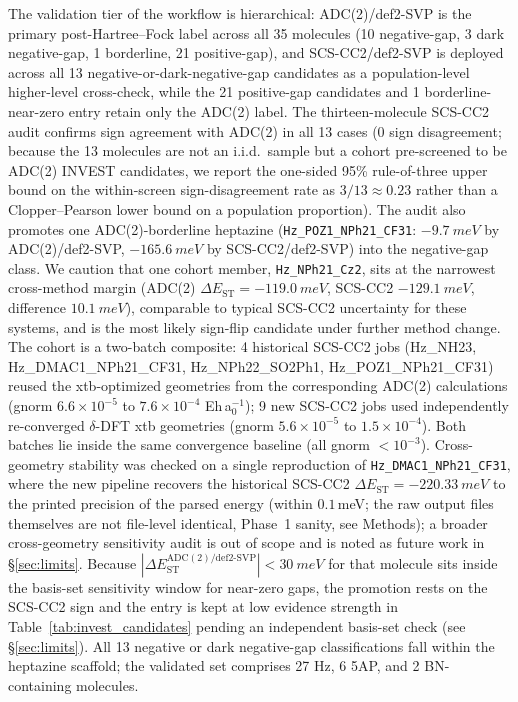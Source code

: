 \documentclass[journal=jcisd8,manuscript=article]{achemso}
\begin{document}
The validation tier of the workflow is hierarchical: ADC(2)/def2-SVP is the primary post-Hartree--Fock label across all 35 molecules (10 negative-gap, 3 dark negative-gap, 1 borderline, 21 positive-gap), and SCS-CC2/def2-SVP is deployed across all 13 negative-or-dark-negative-gap candidates as a population-level higher-level cross-check, while the 21 positive-gap candidates and 1 borderline-near-zero entry retain only the ADC(2) label. The thirteen-molecule SCS-CC2 audit confirms sign agreement with ADC(2) in all 13 cases (0 sign disagreement; because the 13 molecules are not an i.i.d.\ sample but a cohort pre-screened to be ADC(2) INVEST candidates, we report the one-sided 95\% rule-of-three upper bound on the within-screen sign-disagreement rate as $3/13 \approx 0.23$ rather than a Clopper--Pearson lower bound on a population proportion). The audit also promotes one ADC(2)-borderline heptazine (\texttt{Hz\_POZ1\_NPh21\_CF31}: $-\SI{9.7}{meV}$ by ADC(2)/def2-SVP, $-\SI{165.6}{meV}$ by SCS-CC2/def2-SVP) into the negative-gap class. We caution that one cohort member, \texttt{Hz\_NPh21\_Cz2}, sits at the narrowest cross-method margin (ADC(2) $\Delta E_\mathrm{ST}=-\SI{119.0}{meV}$, SCS-CC2 $-\SI{129.1}{meV}$, difference $\SI{10.1}{meV}$), comparable to typical SCS-CC2 uncertainty for these systems, and is the most likely sign-flip candidate under further method change. The cohort is a two-batch composite: 4 historical SCS-CC2 jobs (Hz\_NH23, Hz\_DMAC1\_NPh21\_CF31, Hz\_NPh22\_SO2Ph1, Hz\_POZ1\_NPh21\_CF31) reused the xtb-optimized geometries from the corresponding ADC(2) calculations (gnorm $6.6\!\times\!10^{-5}$ to $7.6\!\times\!10^{-4}$ Eh\,a$_0^{-1}$); 9 new SCS-CC2 jobs used independently re-converged $\delta$-DFT xtb geometries (gnorm $5.6\!\times\!10^{-5}$ to $1.5\!\times\!10^{-4}$). Both batches lie inside the same convergence baseline (all gnorm $<\!10^{-3}$). Cross-geometry stability was checked on a single reproduction of \texttt{Hz\_DMAC1\_NPh21\_CF31}, where the new pipeline recovers the historical SCS-CC2 $\Delta E_\mathrm{ST}=-\SI{220.33}{meV}$ to the printed precision of the parsed energy (within $0.1$\,meV; the raw output files themselves are not file-level identical, Phase~1 sanity, see Methods); a broader cross-geometry sensitivity audit is out of scope and is noted as future work in \S\ref{sec:limits}. Because $|\Delta E_\mathrm{ST}^\mathrm{ADC(2)/def2\text{-}SVP}| < \SI{30}{meV}$ for that molecule sits inside the basis-set sensitivity window for near-zero gaps, the promotion rests on the SCS-CC2 sign and the entry is kept at low evidence strength in Table~\ref{tab:invest_candidates} pending an independent basis-set check (see \S\ref{sec:limits}). All 13 negative or dark negative-gap classifications fall within the heptazine scaffold; the validated set comprises 27 Hz, 6 5AP, and 2 BN-containing molecules.
\end{document}
